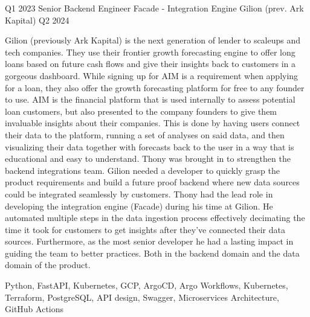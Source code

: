 %
%
%
\begin{experiences}

    \experience
    {Q1 2023}   
    {Senior Backend Engineer}
    {Facade - Integration Engine}
    {Gilion (prev. Ark Kapital)}
    {Q2 2024} {
    
        Gilion (previously Ark Kapital) is the next generation of lender to scaleups and tech companies.
        They use their frontier growth forecasting engine to offer long loans based on future cash flows and give their insights back to customers in a gorgeous dashboard.
        While signing up for AIM is a requirement when applying for a loan, they also offer the growth forecasting platform for free to any founder to use.
        \newline \newline
        AIM is the financial platform that is used internally to assess potential loan customers, but also presented to the company founders to give them invaluable insights about their companies.
        This is done by having users connect their data to the platform, running a set of analyses on said data, and then visualizing their data together with forecasts back to the user in a way that is educational and easy to understand.
        Thony was brought in to strengthen the backend integrations team.
        Gilion needed a developer to quickly grasp the product requirements and build a future proof backend where new data sources could be integrated seamlessly by customers.
        \newline \newline
        Thony had the lead role in developing the integration engine (Facade) during his time at Gilion.
        He automated multiple steps in the data ingestion process effectively decimating the time it took for customers to get insights after they've connected their data sources.
        Furthermore, as the most senior developer he had a lasting impact in guiding the team to better practices.
        Both in the backend domain and the data domain of the product.
        \newline
    }
    {Python, FastAPI, Kubernetes, GCP, ArgoCD, Argo Workflows, Kubernetes, Terraform, PostgreSQL, API design, Swagger, Microservices Architecture, GitHub Actions}
    \emptySeparator
    

\end{experiences}
